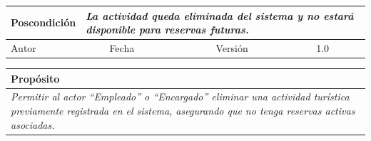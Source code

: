 \begin{table}[H]
\begin{tabular}{llllllll}
        \multicolumn{1}{|l|}{Poscondición}                           & \multicolumn{7}{p{10cm}|}{{\color[HTML]{808080} \textit{La actividad queda eliminada del sistema y no estará disponible para reservas futuras.}}}                                                                                                                                                                                                                                                       \\ \hline
        \multicolumn{1}{|l|}{Autor}                                  & \multicolumn{1}{l|}{{\color[HTML]{808080} \textit{}}}                           & \multicolumn{2}{l|}{Fecha}                                                   & \multicolumn{1}{l|}{}                          & \multicolumn{2}{l|}{Versión}                                                      & \multicolumn{1}{l|}{1.0}                                                     \\ \hline
        \end{tabular}
    \end{table}

    \begin{table}[H]
        \begin{tabular}{llllllll}
        \hline
        \multicolumn{8}{|l|}{\cellcolor[HTML]{F2F2F2}Propósito}                                                                                                                                                                                                                                                                                                                                                                                           \\ \hline
        \multicolumn{8}{|p{15cm}|}{{\color[HTML]{808080} \textit{Permitir al actor “Empleado” o “Encargado” eliminar una actividad turística previamente registrada en el sistema, asegurando que no tenga reservas activas asociadas.}}}                                                                                                                                                                                                             \\ \hline
        \end{tabular}
    \end{table}

